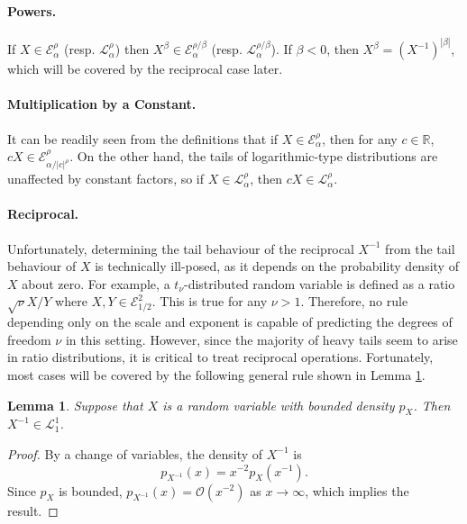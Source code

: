 \documentclass{article}
\newtheorem{lemma}[theorem]{Lemma}
\theoremstyle{definition}
\begin{document}
\paragraph{Powers.} If $X \in \mathcal{E}_\alpha^\rho$ (resp. $\mathcal{L}_\alpha^\rho$) then $X^\beta \in \mathcal{E}_\alpha^{\rho / \beta}$ (resp. $\mathcal{L}_\alpha^{\rho / \beta}$). If $\beta < 0$, then $X^{\beta} = (X^{-1})^{|\beta|}$, which will be covered by the reciprocal case later.

\paragraph{Multiplication by a Constant.}
It can be readily seen from the definitions that if $X \in \mathcal{E}_\alpha^\rho$, then for any $c \in \mathbb{R}$, $c X \in \mathcal{E}_{\alpha / |c|^\rho}^\rho$. On the other hand, the tails of logarithmic-type distributions are unaffected by constant factors, so if $X \in \mathcal{L}_\alpha^\rho$, then $c X \in \mathcal{L}_\alpha^\rho$. 


\paragraph{Reciprocal.}
Unfortunately, determining the tail behaviour of the reciprocal $X^{-1}$ from the tail behaviour of $X$ is technically ill-posed, as it depends on the probability density of $X$ about zero. For example, a $t_\nu$-distributed random variable is defined as a ratio $\sqrt{\nu} X / Y$ where $X,Y \in \mathcal{E}_{1/2}^2$. This is true for any $\nu > 1$. Therefore, no rule depending only on the scale and exponent is capable of predicting the degrees of freedom $\nu$ in this setting. 
However, since the majority of heavy tails seem to arise in ratio distributions, it is critical to treat reciprocal operations. 
Fortunately, most cases will be covered by the following general rule shown in Lemma \ref{lem:Reciprocal}. 

\begin{lemma}
\label{lem:Reciprocal}
Suppose that $X$ is a random variable with bounded density $p_X$. Then $X^{-1} \in \mathcal{L}_1^1$. 
\end{lemma}
\begin{proof}
By a change of variables, the density of $X^{-1}$ is
\[
p_{X^{-1}}(x) = x^{-2}p_X(x^{-1}).
\]
Since $p_X$ is bounded, $p_{X^{-1}}(x) = \mathcal{O}(x^{-2})$ as $x \to \infty$, which implies the result.
\end{proof}
\end{document}
